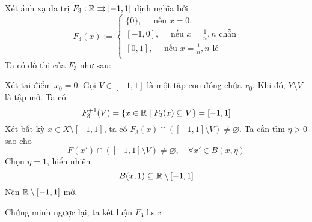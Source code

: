 \documentclass{article}
\begin{document}
\begin{example}
     Xét ánh xạ đa trị $F_3: \mathbb{R} \rightrightarrows [-1, 1]$ định nghĩa bởi
    \begin{equation}
        F_3(x) := \begin{cases}
            \{0\},\quad\text{ nếu } x = 0,\\
            [-1, 0],\quad\text{ nếu } x = \frac{1}{n}, n \text{ chẵn}\\
            [0, 1],\quad\text{ nếu } x = \frac{1}{n}, n \text{ lẻ}\\
        \end{cases}
    \end{equation}
    Ta có đồ thị của $F_3$ như sau:
    \begin{figure}[H]
        \centering
        
        \label{fig:f3}
    \end{figure}
    Xét tại điểm $x_0 = 0$. Gọi $V \in [-1, 1]$ là một tập con đóng chứa $x_0$. Khi đó, $Y \setminus V$ là tập mở. Ta có:
    \begin{equation}
        F_3^{+1}(V) = \{x \in \mathbb{R} \mid F_3(x) \subseteq V\} = [-1, 1]
    \end{equation}
    Xét bất kỳ $x \in X \setminus [-1, 1]$, ta có $F_3(x) \cap ([-1, 1] \setminus V) \ne \varnothing$. Ta cần tìm $\eta > 0$ sao cho 
    \begin{equation}
        F(x') \cap ([-1, 1] \setminus V) \ne \varnothing,\quad \forall x' \in B(x, \eta)
    \end{equation}
    Chọn $\eta = 1$, hiển nhiên 
    \begin{equation}
        B(x, 1) \subseteq \mathbb{R} \setminus [-1, 1]
    \end{equation}
    Nên $\mathbb{R} \setminus [-1, 1]$ mở. 

    Chứng minh ngược lại, ta kết luận $F_3$ l.s.c
\end{example}
\end{document}
